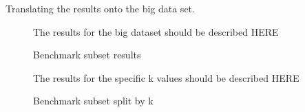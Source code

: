 \documentclass[a4paper,12pt,titlepage, BCOR7mm,headsepline]{scrbook}
\numberwithin{equation}{section}
\begin{document}
Translating the results onto the big data set. 
\begin{figure}[H]
\caption{Benchmark subset results}
\begin{center}

\end{center}
The results for the big dataset should be described HERE
\end{figure}
\begin{figure}[H]
\caption{Benchmark subset split by k}
\begin{center}
\end{center}
The results for the specific k values should be described HERE
\end{figure}
\end{document}
